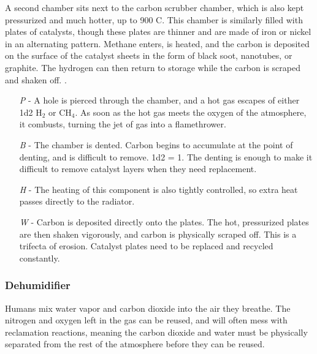 \documentclass[a4paper]{article}
\begin{document}
A second chamber sits next to the carbon scrubber chamber, which is also kept pressurized and much hotter, up to 900 \degree C. This chamber is similarly filled with plates of catalysts, though these plates are thinner and are made of iron or nickel in an alternating pattern. Methane enters, is heated, and the carbon is deposited on the surface of the catalyst sheets in the form of black soot, nanotubes, or graphite. The hydrogen can then return to storage while the carbon is scraped and shaken off. \cite{hydrogen_recapture}. 
\begin{enumerate}
\item [\textit{P}] - A hole is pierced through the chamber, and a hot gas escapes of either 1d2 H$_2$ or CH$_4$. As soon as the hot gas meets the oxygen of the atmosphere, it combusts, turning the jet of gas into a flamethrower.
\item [\textit{B}] - The chamber is dented. Carbon begins to accumulate at the point of denting, and is difficult to remove. \newline \hspace*{3pt} 1d2 = 1. The denting is enough to make it difficult to remove catalyst layers when they need replacement. 
\item [\textit{H}] - The heating of this component is also tightly controlled, so extra heat passes directly to the radiator.
\item [\textit{W}] - Carbon is deposited directly onto the plates. The hot, pressurized plates are then shaken vigorously, and carbon is physically scraped off. This is a trifecta of erosion. Catalyst plates need to be replaced and recycled constantly.
\end{enumerate}

\vspace{-0.5cm} \hspace{-18pt} \subsubsection{Dehumidifier} \label{life_dehumidifier} \vspace{-0.2cm}
Humans mix water vapor and carbon dioxide into the air they breathe. The nitrogen and oxygen left in the gas can be reused, and will often mess with reclamation reactions, meaning the carbon dioxide and water must be physically separated from the rest of the atmosphere before they can be reused.
\end{document}
